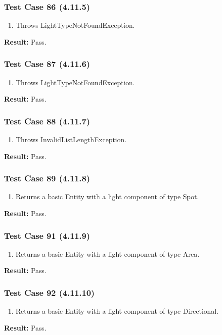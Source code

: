 \documentclass[a4paper,12pt]{article}
\begin{document}
		\subsubsection{Test Case 86 (4.11.5)}
				\begin{enumerate}
					\item Throws LightTypeNotFoundException.
				\end{enumerate}
			\textbf{Result: }Pass.
		\subsubsection{Test Case 87 (4.11.6)}
				\begin{enumerate}
					\item Throws LightTypeNotFoundException.
				\end{enumerate}
			\textbf{Result: }Pass.
		\subsubsection{Test Case 88 (4.11.7)}
				\begin{enumerate}
					\item Throws InvalidListLengthException.
				\end{enumerate}
			\textbf{Result: }Pass.
		\subsubsection{Test Case 89 (4.11.8)}
				\begin{enumerate}
					\item Returns a basic Entity with a light component of type Spot.
				\end{enumerate}
			\textbf{Result: }Pass.
		\subsubsection{Test Case 91 (4.11.9)}
				\begin{enumerate}
					\item Returns a basic Entity with a light component of type Area.
				\end{enumerate}
			\textbf{Result: }Pass.
		\subsubsection{Test Case 92 (4.11.10)}
				\begin{enumerate}
					\item Returns a basic Entity with a light component of type Directional.
				\end{enumerate}
			\textbf{Result: }Pass.
\end{document}
